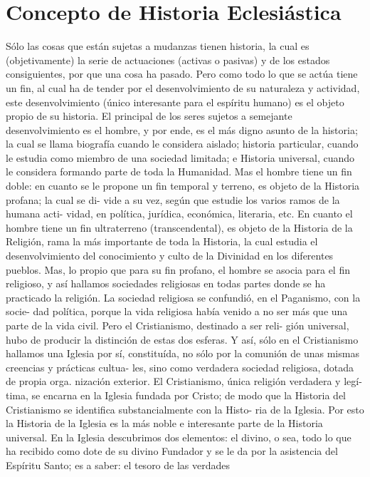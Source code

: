 \raggedbottom{} \documentclass[12pt]{book}
\begin{document}
\section{Concepto de Historia Eclesiástica}
Sólo las cosas que están sujetas a mudanzas tienen historia, la cual
es (objetivamente) la serie de actuaciones (activas o pasivas) y de los
estados consiguientes, por que una cosa ha pasado. Pero como todo lo
que se actúa tiene un fin, al cual ha de tender por el desenvolvimiento
de su naturaleza y actividad, este desenvolvimiento (único interesante
para el espíritu humano) es el objeto propio de su historia.
El principal de los seres sujetos a semejante desenvolvimiento es
el hombre, y por ende, es el más digno asunto de la historia; la cual
se llama biografía cuando le considera aislado; historia particular,
cuando le estudia como miembro de una sociedad limitada; e Historia
universal, cuando le considera formando parte de toda la Humanidad.
Mas el hombre tiene un fin doble: en cuanto se le propone un fin
temporal y terreno, es objeto de la Historia profana; la cual se di-
vide a su vez, según que estudie los varios ramos de la humana acti-
vidad, en política, jurídica, económica, literaria, etc. En cuanto el
hombre tiene un fin ultraterreno (transcendental), es objeto de la
Historia de la Religión, rama la más importante de toda la Historia,
la cual estudia el desenvolvimiento del conocimiento y culto de la
Divinidad en los diferentes pueblos. Mas, lo propio que para su fin
profano, el hombre se asocia para el fin religioso, y así hallamos
sociedades religiosas en todas partes donde se ha practicado la
religión.
La sociedad religiosa se confundió, en el Paganismo, con la socie-
dad política, porque la vida religiosa había venido a no ser más que
una parte de la vida civil. Pero el Cristianismo, destinado a ser reli-
gión universal, hubo de producir la distinción de estas dos esferas.
Y así, sólo en el Cristianismo hallamos una Iglesia por sí, constituída,
no sólo por la comunión de unas mismas creencias y prácticas cultua-
les, sino como verdadera sociedad religiosa, dotada de propia orga.
nización exterior. El Cristianismo, única religión verdadera y legí-
tima, se encarna en la Iglesia fundada por Cristo; de modo que la
Historia del Cristianismo se identifica substancialmente con la Histo-
ria de la Iglesia. Por esto la Historia de la Iglesia es la más noble e
interesante parte de la Historia universal.
En la Iglesia descubrimos dos elementos: el divino, o sea, todo lo
que ha recibido como dote de su divino Fundador y se le da por la
asistencia del Espíritu Santo; es a saber: el tesoro de las verdades
\end{document}
